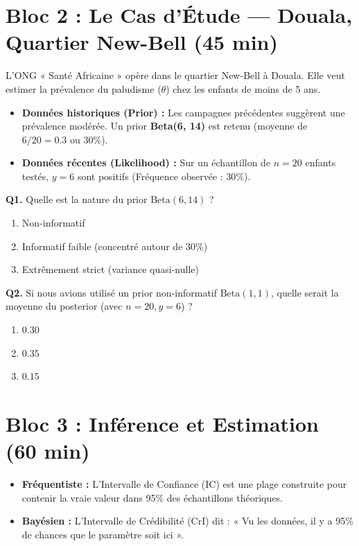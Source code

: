 \documentclass[11pt,a4paper]{article}
\begin{document}
\section{Bloc 2 : Le Cas d'Étude --- Douala, Quartier New-Bell (45 min)}

\begin{application}
L'ONG « Santé Africaine » opère dans le quartier New-Bell à Douala. Elle veut estimer la prévalence du paludisme ($\theta$) chez les enfants de moins de 5 ans.
\begin{itemize}
    \item \textbf{Données historiques (Prior) :} Les campagnes précédentes suggèrent une prévalence modérée. Un prior \textbf{Beta(6, 14)} est retenu (moyenne de $6/20 = 0.3$ ou $30\%$).
    \item \textbf{Données récentes (Likelihood) :} Sur un échantillon de $n = 20$ enfants testés, $y = 6$ sont positifs (Fréquence observée : $30\%$).
\end{itemize}
\end{application}

\begin{qcmbox}
\textbf{Q1.} Quelle est la nature du prior $\text{Beta}(6, 14)$ ?
\begin{enumerate}[label=\Alph*.)]
    \item Non-informatif
    \item Informatif faible (concentré autour de 30\%)
    \item Extrêmement strict (variance quasi-nulle)
\end{enumerate}

\textbf{Q2.} Si nous avions utilisé un prior non-informatif $\text{Beta}(1,1)$, quelle serait la moyenne du posterior (avec $n=20, y=6$) ?
\begin{enumerate}[label=\Alph*.)]
    \item $0.30$
    \item $0.35$
    \item $0.15$
\end{enumerate}
\end{qcmbox}

\section{Bloc 3 : Inférence et Estimation (60 min)}

\begin{rappel}
\begin{itemize}
    \item \textbf{Fréquentiste :} L'Intervalle de Confiance (IC) est une plage construite pour contenir la vraie valeur dans 95\% des échantillons théoriques.
    \item \textbf{Bayésien :} L'Intervalle de Crédibilité (CrI) dit : « Vu les données, il y a 95\% de chances que le paramètre soit ici ».
\end{itemize}
\end{rappel}
\end{document}
